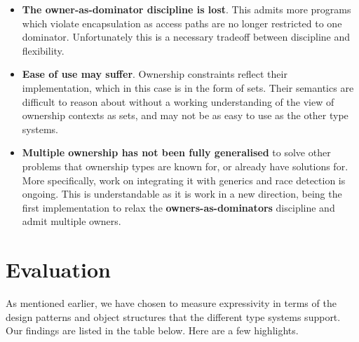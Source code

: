 \documentclass{acm_proc_article-sp}
\begin{document}
\begin{itemize}

    \item \textbf{The owner-as-dominator discipline is lost}. This admits more
        programs which violate encapsulation as access paths are no longer
        restricted to one dominator. Unfortunately this is a necessary tradeoff
        between discipline and flexibility.

    \item \textbf{Ease of use may suffer}. Ownership constraints reflect their
        implementation, which in this case is in the form of sets. Their
        semantics are difficult to reason about without a working understanding
        of the view of ownership contexts as sets, and may not be as easy to use
        as the other type systems.

	\item \textbf{Multiple ownership has not been fully generalised} to solve
		other problems that ownership types are known for, or already have
		solutions for. More specifically, work on integrating it with generics
		and race detection is ongoing. This is understandable as it is work in
		a new direction, being the first implementation to relax the
		\textbf{owners-as-dominators} discipline and admit multiple owners.

\end{itemize}

\section{Evaluation}
\label{sec:eval}

As mentioned earlier, we have chosen to measure expressivity in terms of the
design patterns and object structures that the different type systems support.
Our findings are listed in the table below. Here are a few highlights.
\end{document}
